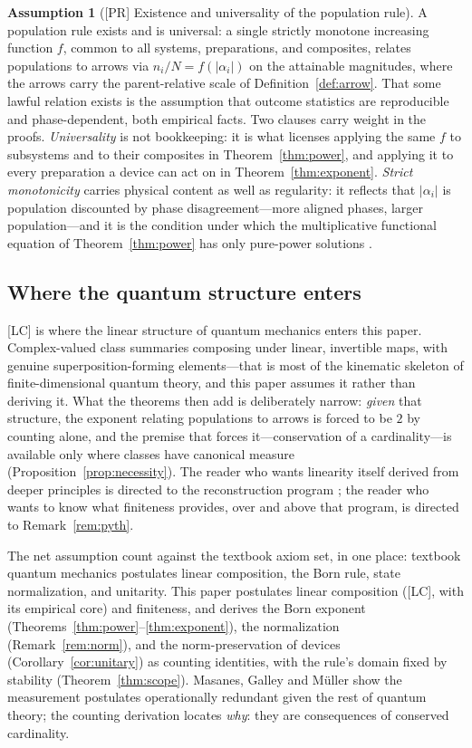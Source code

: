 \documentclass[11pt]{article}
\theoremstyle{definition}
\newtheorem{assumption}{Assumption}
\theoremstyle{remark}
\begin{document}
\begin{assumption}[{[PR]} Existence and universality of the population rule]\label{ass:pr}
A population rule exists and is universal: a single strictly monotone increasing function $f$, common to all systems, preparations, and composites, relates populations to arrows via $n_i/N = f(|\alpha_i|)$ on the attainable magnitudes, where the arrows carry the parent-relative scale of Definition~\ref{def:arrow}. That some lawful relation exists is the assumption that outcome statistics are reproducible and phase-dependent, both empirical facts. Two clauses carry weight in the proofs. \emph{Universality} is not bookkeeping: it is what licenses applying the same $f$ to subsystems and to their composites in Theorem~\ref{thm:power}, and applying it to every preparation a device can act on in Theorem~\ref{thm:exponent}. \emph{Strict monotonicity} carries physical content as well as regularity: it reflects that $|\alpha_i|$ is population discounted by phase disagreement---more aligned phases, larger population---and it is the condition under which the multiplicative functional equation of Theorem~\ref{thm:power} has only pure-power solutions \cite{Aczel1966}.
\end{assumption}

\subsection{Where the quantum structure enters}\label{sec:where}
[LC] is where the linear structure of quantum mechanics enters this paper. Complex-valued class summaries composing under linear, invertible maps, with genuine superposition-forming elements---that is most of the kinematic skeleton of finite-dimensional quantum theory, and this paper assumes it rather than deriving it. What the theorems then add is deliberately narrow: \emph{given} that structure, the exponent relating populations to arrows is forced to be $2$ by counting alone, and the premise that forces it---conservation of a cardinality---is available only where classes have canonical measure (Proposition~\ref{prop:necessity}). The reader who wants linearity itself derived from deeper principles is directed to the reconstruction program \cite{Hardy2001,CDP2011,MasanesMuller2011}; the reader who wants to know what finiteness provides, over and above that program, is directed to Remark~\ref{rem:pyth}.

The net assumption count against the textbook axiom set, in one place: textbook quantum mechanics postulates linear composition, the Born rule, state normalization, and unitarity. This paper postulates linear composition ([LC], with its empirical core) and finiteness, and derives the Born exponent (Theorems~\ref{thm:power}--\ref{thm:exponent}), the normalization (Remark~\ref{rem:norm}), and the norm-preservation of devices (Corollary~\ref{cor:unitary}) as counting identities, with the rule's domain fixed by stability (Theorem~\ref{thm:scope}). Masanes, Galley and M\"uller \cite{MGM2019} show the measurement postulates operationally redundant given the rest of quantum theory; the counting derivation locates \emph{why}: they are consequences of conserved cardinality.
\end{document}
